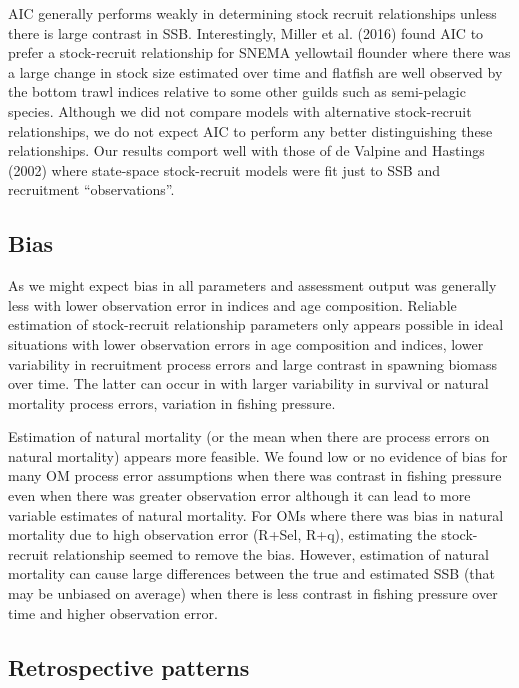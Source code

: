 \documentclass[
  12pt,
]{article}
\begin{document}
AIC generally performs weakly in determining stock recruit relationships
unless there is large contrast in SSB. Interestingly, Miller et al.
(2016) found AIC to prefer a stock-recruit relationship for SNEMA
yellowtail flounder where there was a large change in stock size
estimated over time and flatfish are well observed by the bottom trawl
indices relative to some other guilds such as semi-pelagic species.
Although we did not compare models with alternative stock-recruit
relationships, we do not expect AIC to perform any better distinguishing
these relationships. Our results comport well with those of de Valpine
and Hastings (2002) where state-space stock-recruit models were fit just
to SSB and recruitment ``observations''.

\hypertarget{bias-2}{%
\subsection*{Bias}\label{bias-2}}

As we might expect bias in all parameters and assessment output was
generally less with lower observation error in indices and age
composition. Reliable estimation of stock-recruit relationship
parameters only appears possible in ideal situations with lower
observation errors in age composition and indices, lower variability in
recruitment process errors and large contrast in spawning biomass over
time. The latter can occur in with larger variability in survival or
natural mortality process errors, variation in fishing pressure.

Estimation of natural mortality (or the mean when there are process
errors on natural mortality) appears more feasible. We found low or no
evidence of bias for many OM process error assumptions when there was
contrast in fishing pressure even when there was greater observation
error although it can lead to more variable estimates of natural
mortality. For OMs where there was bias in natural mortality due to high
observation error (R+Sel, R+q), estimating the stock-recruit
relationship seemed to remove the bias. However, estimation of natural
mortality can cause large differences between the true and estimated SSB
(that may be unbiased on average) when there is less contrast in fishing
pressure over time and higher observation error.

\hypertarget{retrospective-patterns}{%
\subsection*{Retrospective patterns}\label{retrospective-patterns}}
\end{document}
